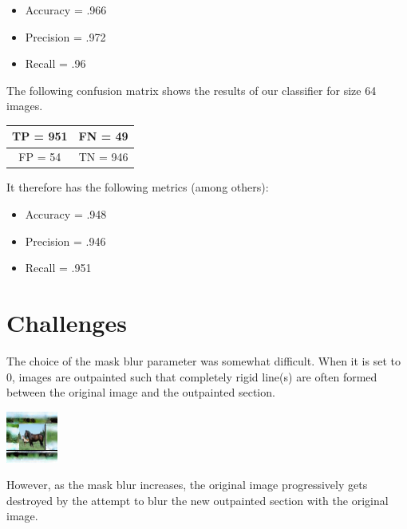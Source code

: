 \documentclass[conference]{IEEEtran}
\begin{document}
\begin{itemize}
    \item Accuracy = .966
    \item Precision = .972
    \item Recall = .96
\end{itemize}

The following confusion matrix shows the results of our classifier for size 64 images.

\begin{center}
\begin{tabular}{|c|c|}
  \hline
  TP = 951 & FN = 49 \\
  \hline
  FP = 54 & TN = 946 \\
  \hline
\end{tabular}
\end{center}

It therefore has the following metrics (among others):

\begin{itemize}
    \item Accuracy = .948
    \item Precision = .946
    \item Recall = .951
\end{itemize}

\section{Challenges}

The choice of the mask blur parameter was somewhat difficult. When it is set to 0, images are outpainted such that completely rigid line(s) are often formed between the original image and the outpainted section.

\includegraphics[]{h264-0.png}

However, as the mask blur increases, the original image progressively gets destroyed by the attempt to blur the new outpainted section with the original image.
\end{document}
